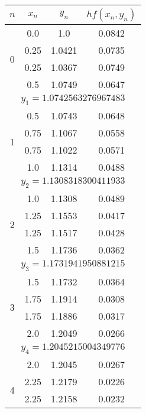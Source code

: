 \begin{longtable}{|c|c|c|c|}\hline
	$n$                 & $x_n$ & $y_n$  & $hf(x_n, y_n)$ \\ \hline
	\endhead
	\multirow{4}{*}{0}  & 0.0   & 1.0    & 0.0842       \\ \cline{2-4} 
	                    & 0.25  & 1.0421 & 0.0735       \\ \cline{2-4} 
	                    & 0.25  & 1.0367 & 0.0749       \\ \cline{2-4} 
	                    & 0.5   & 1.0749 & 0.0647       \\ \hline
	\multicolumn{4}{|c|}{$y_1 = 1.0742563276967483$}    \\ \hline
	\multirow{4}{*}{1}  & 0.5   & 1.0743 & 0.0648       \\ \cline{2-4} 
	                    & 0.75  & 1.1067 & 0.0558       \\ \cline{2-4} 
	                    & 0.75  & 1.1022 & 0.0571       \\ \cline{2-4} 
	                    & 1.0   & 1.1314 & 0.0488       \\ \hline
	\multicolumn{4}{|c|}{$y_2 = 1.1308318300411933$}    \\ \hline
	\multirow{4}{*}{2}  & 1.0   & 1.1308 & 0.0489       \\ \cline{2-4} 
	                    & 1.25  & 1.1553 & 0.0417       \\ \cline{2-4} 
	                    & 1.25  & 1.1517 & 0.0428       \\ \cline{2-4} 
	                    & 1.5   & 1.1736 & 0.0362       \\ \hline
	\multicolumn{4}{|c|}{$y_3 = 1.1731941950881215$}    \\ \hline
	\multirow{4}{*}{3}  & 1.5   & 1.1732 & 0.0364       \\ \cline{2-4} 
	                    & 1.75  & 1.1914 & 0.0308       \\ \cline{2-4} 
	                    & 1.75  & 1.1886 & 0.0317       \\ \cline{2-4} 
	                    & 2.0   & 1.2049 & 0.0266       \\ \hline
	\multicolumn{4}{|c|}{$y_4 = 1.2045215004349776$}    \\ \hline
	                    & 2.0   & 1.2045 & 0.0267       \\ \cline{2-4} 
	\multirow{2}{*}{4}  & 2.25  & 1.2179 & 0.0226       \\ \cline{2-4} 
	                    & 2.25  & 1.2158 & 0.0232       \\ \cline{2-4} 

\end{longtable}

